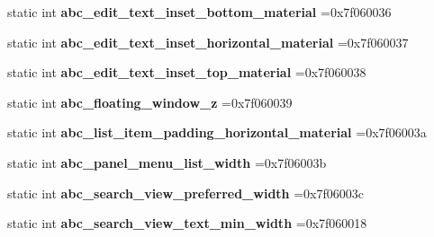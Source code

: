 \begin{DoxyCompactItemize}
\item 
\mbox{\label{classandroid_1_1support_1_1design_1_1R_1_1dimen_a2dab9f39f87038d280c0a28b1227021b}} 
static int {\bfseries abc\+\_\+edit\+\_\+text\+\_\+inset\+\_\+bottom\+\_\+material} =0x7f060036
\item 
\mbox{\label{classandroid_1_1support_1_1design_1_1R_1_1dimen_aa1f360cf238fa6625fac95395485bab1}} 
static int {\bfseries abc\+\_\+edit\+\_\+text\+\_\+inset\+\_\+horizontal\+\_\+material} =0x7f060037
\item 
\mbox{\label{classandroid_1_1support_1_1design_1_1R_1_1dimen_aef184cda1948d3b703275c3311b5a5ee}} 
static int {\bfseries abc\+\_\+edit\+\_\+text\+\_\+inset\+\_\+top\+\_\+material} =0x7f060038
\item 
\mbox{\label{classandroid_1_1support_1_1design_1_1R_1_1dimen_a6b83d118aed3efd97ad8f9b95e6ee2be}} 
static int {\bfseries abc\+\_\+floating\+\_\+window\+\_\+z} =0x7f060039
\item 
\mbox{\label{classandroid_1_1support_1_1design_1_1R_1_1dimen_a90e44d7baef9bd97f936df60f9765f49}} 
static int {\bfseries abc\+\_\+list\+\_\+item\+\_\+padding\+\_\+horizontal\+\_\+material} =0x7f06003a
\item 
\mbox{\label{classandroid_1_1support_1_1design_1_1R_1_1dimen_ad908d313a2a7bdbb3ed9ae32424bb031}} 
static int {\bfseries abc\+\_\+panel\+\_\+menu\+\_\+list\+\_\+width} =0x7f06003b
\item 
\mbox{\label{classandroid_1_1support_1_1design_1_1R_1_1dimen_a91a3a522ac7305e9db72f7cc21261b7a}} 
static int {\bfseries abc\+\_\+search\+\_\+view\+\_\+preferred\+\_\+width} =0x7f06003c
\item 
\mbox{\label{classandroid_1_1support_1_1design_1_1R_1_1dimen_a1f1a00b68d867014f98f491ced488def}} 
static int {\bfseries abc\+\_\+search\+\_\+view\+\_\+text\+\_\+min\+\_\+width} =0x7f060018

\end{DoxyCompactItemize}
